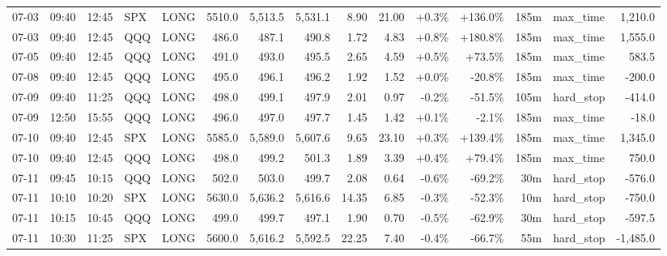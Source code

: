 \documentclass[11pt,a4paper,twoside]{article}
\begin{document}
\begin{landscape}
\begin{center}
\begin{longtable}{>{\color{txtmain}}l l l l l r r r r r r r r >{\color{txtmain}}l r}
07-03 & 09:40 & 12:45 & SPX & LONG & 5510.0 & 5,513.5 & 5,531.1 & 8.90 & 21.00 & \textcolor{wingreen}{+0.3\%} & \textcolor{wingreen}{+136.0\%} & 185m & max\_time & \textcolor{wingreen}{1,210.0} \\
07-03 & 09:40 & 12:45 & QQQ & LONG & 486.0 & 487.1 & 490.8 & 1.72 & 4.83 & \textcolor{wingreen}{+0.8\%} & \textcolor{wingreen}{+180.8\%} & 185m & max\_time & \textcolor{wingreen}{1,555.0} \\
07-05 & 09:40 & 12:45 & QQQ & LONG & 491.0 & 493.0 & 495.5 & 2.65 & 4.59 & \textcolor{wingreen}{+0.5\%} & \textcolor{wingreen}{+73.5\%} & 185m & max\_time & \textcolor{wingreen}{583.5} \\
07-08 & 09:40 & 12:45 & QQQ & LONG & 495.0 & 496.1 & 496.2 & 1.92 & 1.52 & \textcolor{wingreen}{+0.0\%} & \textcolor{lossred}{-20.8\%} & 185m & max\_time & \textcolor{lossred}{-200.0} \\
07-09 & 09:40 & 11:25 & QQQ & LONG & 498.0 & 499.1 & 497.9 & 2.01 & 0.97 & \textcolor{lossred}{-0.2\%} & \textcolor{lossred}{-51.5\%} & 105m & hard\_stop & \textcolor{lossred}{-414.0} \\
07-09 & 12:50 & 15:55 & QQQ & LONG & 496.0 & 497.0 & 497.7 & 1.45 & 1.42 & \textcolor{wingreen}{+0.1\%} & \textcolor{lossred}{-2.1\%} & 185m & max\_time & \textcolor{lossred}{-18.0} \\
07-10 & 09:40 & 12:45 & SPX & LONG & 5585.0 & 5,589.0 & 5,607.6 & 9.65 & 23.10 & \textcolor{wingreen}{+0.3\%} & \textcolor{wingreen}{+139.4\%} & 185m & max\_time & \textcolor{wingreen}{1,345.0} \\
07-10 & 09:40 & 12:45 & QQQ & LONG & 498.0 & 499.2 & 501.3 & 1.89 & 3.39 & \textcolor{wingreen}{+0.4\%} & \textcolor{wingreen}{+79.4\%} & 185m & max\_time & \textcolor{wingreen}{750.0} \\
07-11 & 09:45 & 10:15 & QQQ & LONG & 502.0 & 503.0 & 499.7 & 2.08 & 0.64 & \textcolor{lossred}{-0.6\%} & \textcolor{lossred}{-69.2\%} & 30m & hard\_stop & \textcolor{lossred}{-576.0} \\
07-11 & 10:10 & 10:20 & SPX & LONG & 5630.0 & 5,636.2 & 5,616.6 & 14.35 & 6.85 & \textcolor{lossred}{-0.3\%} & \textcolor{lossred}{-52.3\%} & 10m & hard\_stop & \textcolor{lossred}{-750.0} \\
07-11 & 10:15 & 10:45 & QQQ & LONG & 499.0 & 499.7 & 497.1 & 1.90 & 0.70 & \textcolor{lossred}{-0.5\%} & \textcolor{lossred}{-62.9\%} & 30m & hard\_stop & \textcolor{lossred}{-597.5} \\
07-11 & 10:30 & 11:25 & SPX & LONG & 5600.0 & 5,616.2 & 5,592.5 & 22.25 & 7.40 & \textcolor{lossred}{-0.4\%} & \textcolor{lossred}{-66.7\%} & 55m & hard\_stop & \textcolor{lossred}{-1,485.0} \\

\end{longtable}
\end{center}
\end{landscape}
\end{document}
